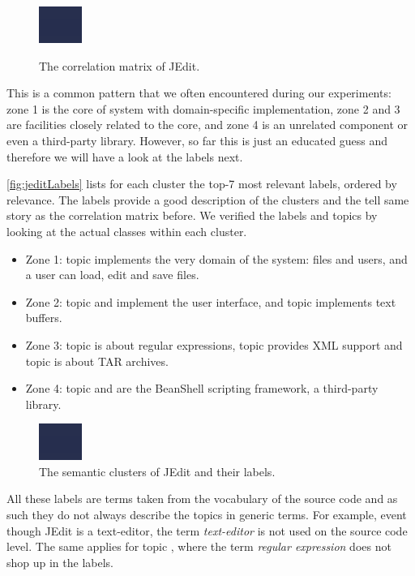 \begin{figure}[b]
  \centering
  \includegraphics{jeditcorrelationzone}\\
  \caption{The correlation matrix of JEdit.}\label{fig:jeditCorrelation}
\end{figure}

This is a common pattern that we often encountered during our experiments: zone 1 is the core of system with domain-specific implementation, zone 2 and 3 are facilities closely related to the core, and zone 4 is an unrelated component or even a third-party library. However, so far this is just an educated guess and therefore we will have a look at the labels next.

\autoref{fig:jeditLabels} lists for each cluster the top-7 most relevant labels, ordered by relevance. The labels provide a good description of the clusters and the tell same story as the correlation matrix before. We verified the labels and topics by looking at the actual classes within each cluster.

\begin{itemize}
  \item Zone 1: topic \red implements the very domain of the system: files and users, and a user can load, edit and save files.
  \item Zone 2: topic \green and \magenta implement the user interface, and topic \pink implements text buffers.
  \item Zone 3: topic \cyan is about regular expressions, topic \yellow provides XML support and topic \darkgreen is about TAR archives.
  \item Zone 4: topic \blue and \orange are the BeanShell scripting framework, a third-party library.
\end{itemize}

\begin{figure}[h]
\centering
\includegraphics{jeditCorrelationLabels}
\caption{The semantic clusters of JEdit and their labels.}\label{fig:jeditLabels}
\end{figure}

All these labels are terms taken from the vocabulary of the source code and as such they do not always describe the topics in generic terms. For example, event though JEdit is a text-editor, the term \emph{text-editor} is not used on the source code level. The same applies for topic \cyan, where the term \emph{regular expression} does not shop up in the labels.

